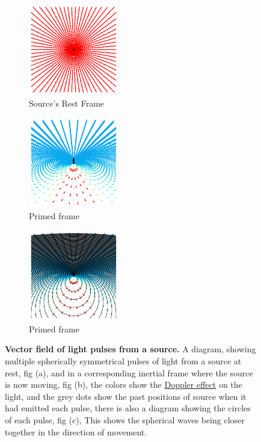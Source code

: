 \begin{figure}[H]
	\begin{subfigure}{.325\textwidth}
		\centering
		\includegraphics[width = 3.95cm]{images/pdf/Field_Rest_Frame.pdf}
		\caption{Source's Rest Frame}
		\label{fig: vector field of light source rest frame}
	\end{subfigure}
	\begin{subfigure}{.325\textwidth}
		\centering
		\includegraphics[width = 3.95cm]{images/pdf/Field_Moving_Frame_Doppler.pdf}
		\caption{Primed frame}
		\label{fig: vector field of light source primed frame}
	\end{subfigure}
	\begin{subfigure}{.325\textwidth}
		\centering
		\includegraphics[width = 3.95cm]{images/pdf/Field_Moving_Frame_Doppler_circles.pdf}
		\caption{Primed frame}
		\label{fig: vector field of light source with rings}
	\end{subfigure}
	\caption{\textbf{Vector field of light pulses from a source.} A diagram, showing multiple spherically symmetrical pulses of light from a source at rest, fig (a), and in a corresponding inertial frame where the source is now moving, fig (b), the colors show the \protect\hyperlink{def-doppler-effect}{Doppler effect} on the light, and the grey dots show the past positions of source when it had emitted each pulse, there is also a diagram showing the circles of each pulse, fig (c), This shows the spherical waves being closer together in the direction of movement.} %
	\label{fig: vector field of light source}
\end{figure}

